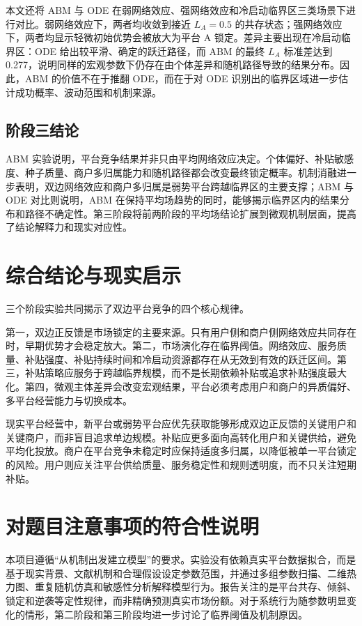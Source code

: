 \documentclass[UTF8,zihao=-4]{ctexart}
\begin{document}
本文还将 ABM 与 ODE 在弱网络效应、强网络效应和冷启动临界区三类场景下进行对比。弱网络效应下，两者均收敛到接近 $L_A=0.5$ 的共存状态；强网络效应下，两者均显示轻微初始优势会被放大为平台 A 锁定。差异主要出现在冷启动临界区：ODE 给出较平滑、确定的跃迁路径，而 ABM 的最终 $L_A$ 标准差达到 0.277，说明同样的宏观参数下仍存在由个体差异和随机路径导致的结果分布。因此，ABM 的价值不在于推翻 ODE，而在于对 ODE 识别出的临界区域进一步估计成功概率、波动范围和机制来源。

\subsection{阶段三结论}

ABM 实验说明，平台竞争结果并非只由平均网络效应决定。个体偏好、补贴敏感度、种子质量、商户多归属能力和随机路径都会改变最终锁定概率。机制消融进一步表明，双边网络效应和商户多归属是弱势平台跨越临界区的主要支撑；ABM 与 ODE 对比则说明，ABM 在保持平均场趋势的同时，能够揭示临界区内的结果分布和路径不确定性。第三阶段将前两阶段的平均场结论扩展到微观机制层面，提高了结论解释力和现实对应性。

\section{综合结论与现实启示}

三个阶段实验共同揭示了双边平台竞争的四个核心规律。

第一，双边正反馈是市场锁定的主要来源。只有用户侧和商户侧网络效应共同存在时，早期优势才会稳定放大。第二，市场演化存在临界阈值。网络效应、服务质量、补贴强度、补贴持续时间和冷启动资源都存在从无效到有效的跃迁区间。第三，补贴策略应服务于跨越临界规模，而不是长期依赖补贴或追求补贴强度最大化。第四，微观主体差异会改变宏观结果，平台必须考虑用户和商户的异质偏好、多平台经营能力与切换成本。

现实平台经营中，新平台或弱势平台应优先获取能够形成双边正反馈的关键用户和关键商户，而非盲目追求单边规模。补贴应更多面向高转化用户和关键供给，避免平均化投放。商户在平台竞争未稳定时应保持适度多归属，以降低被单一平台锁定的风险。用户则应关注平台供给质量、服务稳定性和规则透明度，而不只关注短期补贴。

\section{对题目注意事项的符合性说明}

本项目遵循“从机制出发建立模型”的要求。实验没有依赖真实平台数据拟合，而是基于现实背景、文献机制和合理假设设定参数范围，并通过多组参数扫描、二维热力图、重复随机仿真和敏感性分析解释模型行为。报告关注的是平台共存、倾斜、锁定和逆袭等定性规律，而非精确预测真实市场份额。对于系统行为随参数明显变化的情形，第二阶段和第三阶段均进一步讨论了临界阈值及机制原因。
\end{document}
